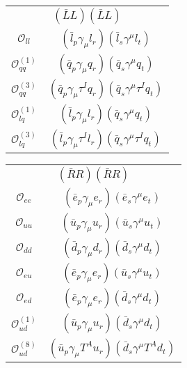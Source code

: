 \begin{table}
\begin{center}
		\begin{minipage}[t]{4.95cm}
			\renewcommand{\arraystretch}{1.5}
			\begin{tabular}[t]{c|c}
				\multicolumn{2}{c}{$(\bar LL)(\bar LL)$} \\
				\toplinetwo
				$\mathcal{O}_{ll}$        & $(\bar l_p \gamma_\mu l_r)(\bar l_s \gamma^\mu l_t)$ \\
				$\mathcal{O}_{qq}^{(1)}$  & $(\bar q_p \gamma_\mu q_r)(\bar q_s \gamma^\mu q_t)$ \\
				$\mathcal{O}_{qq}^{(3)}$  & $(\bar q_p \gamma_\mu \tau^I q_r)(\bar q_s \gamma^\mu \tau^I q_t)$ \\
				$\mathcal{O}_{lq}^{(1)}$                & $(\bar l_p \gamma_\mu l_r)(\bar q_s \gamma^\mu q_t)$ \\
				$\mathcal{O}_{lq}^{(3)}$                & $(\bar l_p \gamma_\mu \tau^I l_r)(\bar q_s \gamma^\mu \tau^I q_t)$ 
			\end{tabular}
		\end{minipage}
		\begin{minipage}[t]{5.45cm}
			\renewcommand{\arraystretch}{1.5}
			\begin{tabular}[t]{c|c}
				\multicolumn{2}{c}{$(\bar RR)(\bar RR)$} \\
				\toplinetwo
				$\mathcal{O}_{ee}$               & $(\bar e_p \gamma_\mu e_r)(\bar e_s \gamma^\mu e_t)$ \\
				$\mathcal{O}_{uu}$        & $(\bar u_p \gamma_\mu u_r)(\bar u_s \gamma^\mu u_t)$ \\
				$\mathcal{O}_{dd}$        & $(\bar d_p \gamma_\mu d_r)(\bar d_s \gamma^\mu d_t)$ \\
				$\mathcal{O}_{eu}$                      & $(\bar e_p \gamma_\mu e_r)(\bar u_s \gamma^\mu u_t)$ \\
				$\mathcal{O}_{ed}$                      & $(\bar e_p \gamma_\mu e_r)(\bar d_s\gamma^\mu d_t)$ \\
				$\mathcal{O}_{ud}^{(1)}$                & $(\bar u_p \gamma_\mu u_r)(\bar d_s \gamma^\mu d_t)$ \\
				$\mathcal{O}_{ud}^{(8)}$                & $(\bar u_p \gamma_\mu T^A u_r)(\bar d_s \gamma^\mu T^A d_t)$ \\
			\end{tabular}
		\end{minipage}


\end{center}
\end{table}

